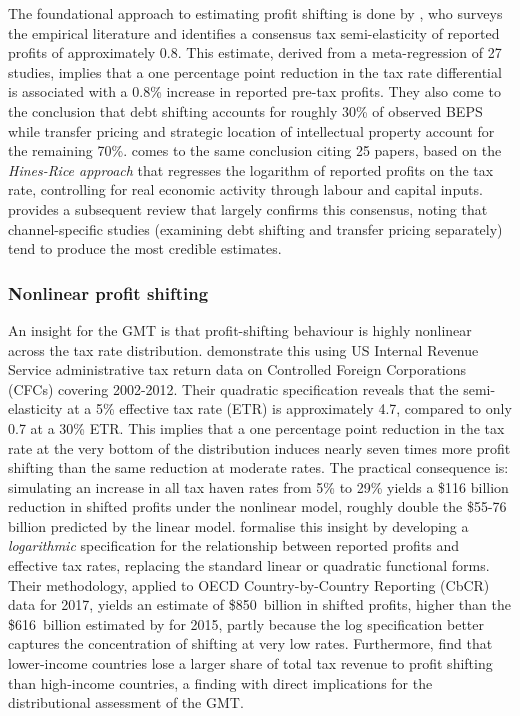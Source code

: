 \documentclass[11pt,a4paper]{article}
\begin{document}
The foundational approach to estimating profit shifting is done by \citet{heckemeyer2017}, who surveys the empirical literature and identifies a consensus tax semi-elasticity of reported profits of approximately 0.8. This estimate, derived from a meta-regression of 27 studies, implies that a one percentage point reduction in the tax rate differential is associated with a 0.8\% increase in reported pre-tax profits. They also come to the conclusion that debt shifting accounts for roughly 30\% of observed BEPS while transfer pricing and strategic location of intellectual property account for the remaining 70\%. \citet{dharmapala2014} comes to the same conclusion citing 25 papers, based on the \emph{Hines-Rice approach} that regresses the logarithm of reported profits on the tax rate, controlling for real economic activity through labour and capital inputs. \citet{riedel2018} provides a subsequent review that largely confirms this consensus, noting that channel-specific studies (examining debt shifting and transfer pricing separately) tend to produce the most credible estimates. 

\subsubsection{Nonlinear profit shifting}

An insight for the GMT is that profit-shifting behaviour is highly nonlinear across the tax rate distribution. \citet{dowd2017} demonstrate this using US Internal Revenue Service administrative tax return data on Controlled Foreign Corporations (CFCs) covering 2002-2012. Their quadratic specification reveals that the semi-elasticity at a 5\% effective tax rate (ETR) is approximately 4.7, compared to only 0.7 at a 30\% ETR. This implies that a one percentage point reduction in the tax rate at the very bottom of the distribution induces nearly seven times more profit shifting than the same reduction at moderate rates. The practical consequence is: simulating an increase in all tax haven rates from 5\% to 29\% yields a \$116 billion reduction in shifted profits under the nonlinear model, roughly double the \$55-76 billion predicted by the linear model. \textcite{garcia2024} formalise this insight by developing a \emph{logarithmic} specification for the relationship between reported profits and effective tax rates, replacing the standard linear or quadratic functional forms. Their methodology, applied to OECD Country-by-Country Reporting (CbCR) data for 2017, yields an estimate of \$850~billion in shifted profits, higher than the \$616~billion estimated by \textcite{torslov2022} for 2015, partly because the log specification better captures the concentration of shifting at very low rates. Furthermore, \textcite{garcia2024} find that lower-income countries lose a larger share of total tax revenue to profit shifting than high-income countries, a finding with direct implications for the distributional assessment of the GMT.
\end{document}
